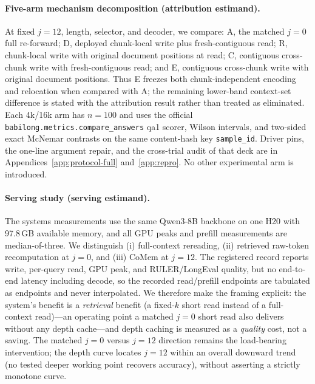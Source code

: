 \paragraph{Five-arm mechanism decomposition (attribution estimand).}
At fixed $j=12$, length, selector, and decoder, we compare: A, the matched
$j=0$ full re-forward; D, deployed chunk-local write plus fresh-contiguous
read; R, chunk-local write with original document positions at read; C,
contiguous cross-chunk write with fresh-contiguous read; and E, contiguous
cross-chunk write with original document positions.  Thus E freezes both
chunk-independent encoding and relocation when compared with A; the remaining
lower-band context-set difference is stated with the attribution result rather than
treated as eliminated.  Each 4k/16k arm has $n=100$ and uses the official
\texttt{babilong.metrics.compare\_answers} qa1 scorer, Wilson intervals, and
two-sided exact McNemar contrasts on the same content-hash key
\texttt{sample\_id}.  Driver pins, the one-line argument repair, and the
cross-trial audit of that deck are in Appendices~\ref{app:protocol-full}
and~\ref{app:repro}.  No other experimental arm is introduced.

\paragraph{Serving study (serving estimand).}
The systems measurements use the same Qwen3-8B backbone on one H20 with
97.8\,GB available memory, and all GPU peaks and prefill measurements are
median-of-three.  We distinguish (i) full-context rereading, (ii) retrieved
raw-token recomputation at $j=0$, and (iii) CoMem at $j=12$.  The registered
record reports write, per-query read, GPU peak, and RULER/LongEval quality, but
no end-to-end latency including decode, so the recorded read/prefill endpoints
are tabulated as endpoints and never interpolated.  We therefore make the
framing explicit: the system's benefit is a \emph{retrieval} benefit (a
fixed-$k$ short read instead of a full-context read)---an operating point a
matched $j{=}0$ short read also delivers without any depth cache---and depth
caching is measured as a \emph{quality} cost, not a saving.  The matched $j=0$
versus
$j=12$ direction remains the load-bearing intervention; the depth curve locates
$j{=}12$ within an overall downward trend (no tested deeper working point
recovers accuracy), without asserting a strictly monotone curve.
